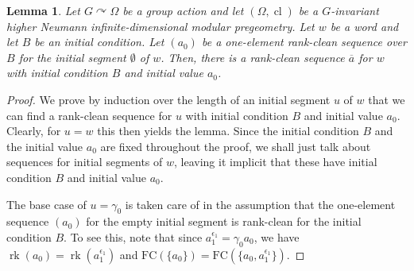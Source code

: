 \documentclass{article}
\newtheorem{lemma}[theorem]{Lemma}
\theoremstyle{remark}
\theoremstyle{definition}
\def\acts{\curvearrowright}
\DeclareMathOperator{\rk}{rk}
\DeclareMathOperator{\cl}{cl}
\begin{document}
{\begin{lemma}\label{lem:hardinduction} 
{Let $G\acts \Omega$ be a group action and let $(\Omega, {\cl})$ be a $G$-invariant  higher Neumann infinite-dimensional modular pregeometry.} %
Let $w$ be a %
word and let $B$ be {an} initial condition. 
 Let $(a_0)$ be a one-element rank-clean sequence over $B$ for the initial segment $\emptyset$ of $w$. 
 Then, there is a rank-clean  sequence $\overline{a}$ for $w$ with initial condition $B$ and initial value $a_0$.  
\end{lemma}
\begin{proof}
    We prove by induction over the length of an initial segment $u$ of $w$ that we can find a rank-clean sequence for $u$ with initial condition $B$ and initial value $a_0$. Clearly, for $u=w$ this then yields the lemma. Since the initial condition $B$ and the initial value $a_0$ are  fixed throughout the proof, we shall just talk about  sequences for initial segments of $w$, leaving it implicit that these have initial condition $B$ and initial value $a_0$.

    The base case of 
    $u=\gamma_0$ 
    is taken care of in the assumption that  the one-element sequence $(a_0)$ for the empty initial segment is rank-clean for the initial condition $B$. {To see this, note that since  $a_1^{\epsilon_1}=\gamma_0 a_0$, we have  $\rk(a_0)=\rk(a_1^{\epsilon_1})$ and $\mathrm{FC}(\{a_0\})=\mathrm{FC}(\{a_0, a_1^{\epsilon_1}\})$.}


\end{proof}}
\end{document}
